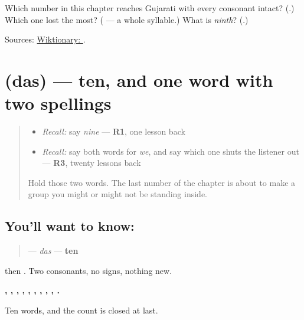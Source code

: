 \begin{tcolorbox}[breakable,colback=teal!4,colframe=teal!35!black,title={Before you move on}]
Which number in this chapter reaches Gujarati with every consonant intact? (\textbf{}.) Which one lost the most? (\textbf{} — a whole syllable.) What is \emph{ninth}? (\textbf{}.)

Sources: \href{https://en.wiktionary.org/wiki/\%E0\%AA\%A8\%E0\%AA\%B5}{Wiktionary: }.
\end{tcolorbox}
\section[\texorpdfstring{\gu{દસ} (das)}{દસ (das)}]{ (das) — ten, and one word with two spellings}

\label{lesson:GU-C39-das}



\begin{quote}
\begin{itemize}
\raggedright
  \item \emph{Recall:} say \emph{nine} — \textbf{R1}, one lesson back
  \item \emph{Recall:} say both words for \emph{we}, and say which one shuts the listener out — \textbf{R3}, twenty lessons back
\end{itemize}

Hold those two words. The last number of the chapter is about to make a group you might or might not be standing inside.
\end{quote}

\subsection*{You'll want to know: }
\begin{quote}
\textbf{} — \emph{das} — \textbf{ten}
\end{quote}

\textbf{} then \textbf{}. Two consonants, no signs, nothing new.

\textbf{, , , , , , , , , .}

Ten words, and the count is closed at last.

